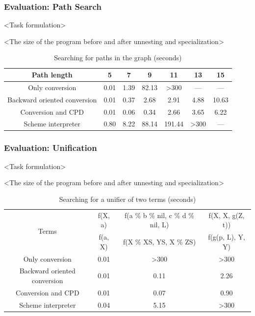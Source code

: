 \documentclass[xcolor=table]{beamer}
\begin{document}
\begin{frame}[fragile]
  \transwipe[direction=90]
  \frametitle{Evaluation: Path Search}

<Task formulation>

<The size of the program before and after unnesting and specialization>

\begin{table}
\footnotesize
\centering
\begin{tabular}{c|c|c|c|c|c|c}
Path length                   & 5      & 7     & 9      & 11      & 13     & 15        \\
\hline\hline
Only conversion               & 0.01  & 1.39 &  82.13 & >300     & ---      & ---     \\
\hline
Backward oriented conversion  & 0.01 & 0.37 &  2.68 & 2.91   & 4.88    & 10.63   \\
\hline
Conversion and CPD            & 0.01  & 0.06 &  0.34 & 2.66   & 3.65    & 6.22  \\
\hline
Scheme interpreter            & 0.80  & 8.22 & 88.14 & 191.44 & >300   & ---   \\
\end{tabular}

 \caption{Searching for paths in the graph (seconds)}
    \label{tab:isPath}
\end{table}
\end{frame}

\begin{frame}[fragile]
  \transwipe[direction=90]
  \frametitle{Evaluation: Unification}

<Task formulation>

<The size of the program before and after unnesting and specialization>

\begin{table}
\tiny
\centering
\begin{tabular}{c|c|c|c}
\multirow{ 2}{*}{Terms} & 
f(X, a) & f(a \% b \% nil, c \% d \% nil, L) & f(X, X, g(Z, t))  \\
\cline{2-4} &
f(a, X) & f(X \% XS, YS, X \% ZS) & f(g(p, L), Y, Y)  \\
\hline\hline
Only conversion               & 0.01  &  >300 & >300 \\
\hline
Backward oriented conversion  & 0.01  &  0.11 & 2.26  \\
\hline
Conversion and CPD            & 0.01  &  0.07 & 0.90  \\
\hline

Scheme interpreter            & 0.04  & 5.15 & >300   \\
\end{tabular}
 \caption{Searching for a unifier of two terms (seconds)}
    \label{tab:uni}
\end{table}
\end{frame}
\end{document}
